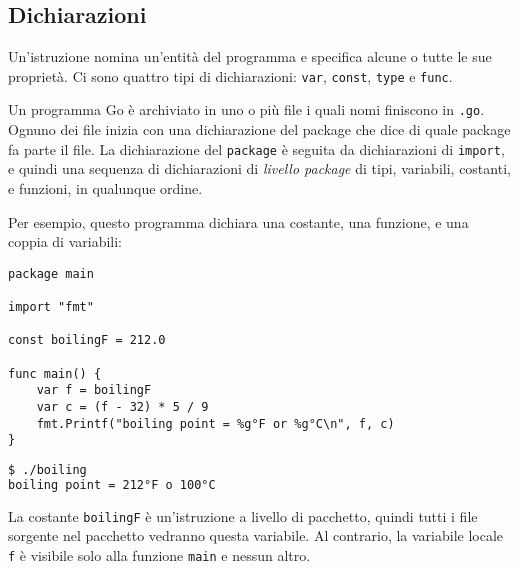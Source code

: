 \documentclass[../../thesis.tex]{subfiles}
\begin{document}
    \subsection{Dichiarazioni}\label{subsec:dichiarazioni}
    Un'istruzione nomina un'entità del programma e specifica alcune o tutte le sue proprietà.
    Ci sono quattro tipi di dichiarazioni: \verb"var", \verb"const", \verb"type" e \verb"func".
    \hfill \vspace{12pt}

    Un programma Go è archiviato in uno o più file i quali nomi finiscono in \verb".go".
    Ognuno dei file inizia con una dichiarazione del package che dice di quale package fa parte il file.
    La dichiarazione del \verb"package" è seguita da dichiarazioni di \verb"import", e quindi una sequenza di dichiarazioni di \textit{livello package} di tipi, variabili, costanti, e funzioni, in qualunque ordine.
    \hfill \vspace{12pt}

    \clearpage
    \newpage
    Per esempio, questo programma dichiara una costante, una funzione, e una coppia di variabili:
    \begin{lstlisting}[frame = single, label = {lst:lstlisting1-2.1}]
package main

import "fmt"

const boilingF = 212.0

func main() {
    var f = boilingF
    var c = (f - 32) * 5 / 9
    fmt.Printf("boiling point = %g°F or %g°C\n", f, c)
}
    \end{lstlisting}
    \begin{lstlisting}[language = bash, frame = L, label = {lst:lstlisting1-2.2}]
$ ./boiling
boiling point = 212°F o 100°C
    \end{lstlisting}
    La costante \verb"boilingF" è un'istruzione a livello di pacchetto, quindi tutti i file sorgente nel pacchetto vedranno questa variabile.
    Al contrario, la variabile locale \verb"f" è visibile solo alla funzione \verb"main" e nessun altro.
\end{document}
